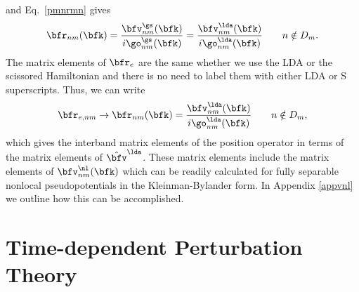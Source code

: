 \documentclass[floatfix,prb,aps,superscriptaddress,11pt,preprint,letterpaper]{revtex4}
\begin{document}
and Eq.~\eqref{pmnrmn} gives
\begin{align}\label{chon.10}
\bfr_{nm}(\bfk)
=
\frac{\bfv^\gs_{nm}(\bfk)}{i\go^\gs_{nm}(\bfk)}
=
\frac{\bfv^\lda_{nm}(\bfk)}{i\go^\lda_{nm}(\bfk)}
\quad\quad n\notin D_m
.
\end{align}
The matrix elements
of $\bfr_e$ are the same whether we use the LDA or the scissored
Hamiltonian and there is no need to label them with either LDA
or S superscripts. Thus,
we can write
\begin{equation}\label{chon.98}
\bfr_{e,nm}\to
\bfr_{nm}(\bfk)=\frac{\bfv^\lda_{nm}(\bfk)}{i\go^\lda_{nm}(\bfk)}
\quad\quad n\notin D_m
,
\end{equation}   
which gives the interband matrix elements of the position operator
in terms of the matrix elements of $\hat\bfv^\lda$. 
These matrix elements include the matrix elements of
$\bfv^\nl_{nm}(\bfk)$ which can be readily calculated\cite{francesco} for 
fully separable nonlocal pseudopotentials in the 
Kleinman-Bylander 
form.\cite{mottaCMS10,kleinman_efficacious_1982,adolphPRB96}
In Appendix \ref{appvnl} we outline how this  
can be accomplished. 

\section{Time-dependent Perturbation Theory}\label{tdpt}
\end{document}
